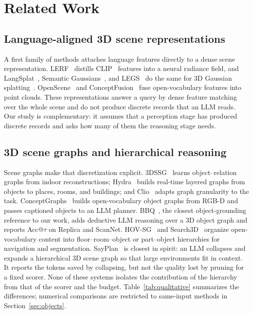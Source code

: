 \documentclass{ieeeaccess}
\begin{document}
\section{Related Work}
\label{sec:related}

\subsection{Language-aligned 3D scene representations}
A first family of methods attaches language features directly to a dense scene
representation. LERF~\cite{kerr2023lerf} distills CLIP~\cite{radford2021clip}
features into a neural radiance field, and LangSplat~\cite{langsplat2024},
Semantic Gaussians~\cite{semanticgaussians2024}, and LEGS~\cite{legs2024} do the
same for 3D Gaussian splatting~\cite{kerbl20233dgs}.
OpenScene~\cite{openscene2023} and ConceptFusion~\cite{conceptfusion2023} fuse
open-vocabulary features into point clouds. These representations answer a query
by dense feature matching over the whole scene and do not produce discrete
records that an LLM reads. Our study is complementary: it assumes that a
perception stage has produced discrete records and asks how many of them the
reasoning stage needs.

\subsection{3D scene graphs and hierarchical reasoning}
Scene graphs make that discretization explicit. 3DSSG~\cite{wald20203dssg}
learns object--relation graphs from indoor reconstructions;
Hydra~\cite{hydra2022} builds real-time layered graphs from objects to places,
rooms, and buildings; and Clio~\cite{maggio2024clio} adapts graph granularity to
the task. ConceptGraphs~\cite{gu2023conceptgraphs} builds open-vocabulary object
graphs from RGB-D and passes captioned objects to an LLM planner.
BBQ~\cite{bbq2024}, the closest object-grounding reference to our work, adds
deductive LLM reasoning over a 3D object graph and reports Acc@$\tau$ on Replica
and ScanNet. HOV-SG~\cite{hovsg2024} and Search3D~\cite{takmaz2025search3d}
organize open-vocabulary content into floor--room--object or part--object
hierarchies for navigation and segmentation. SayPlan~\cite{rana2023sayplan} is
closest in spirit: an LLM collapses and expands a hierarchical 3D scene graph so
that large environments fit in context. It reports the tokens saved by
collapsing, but not the quality lost by pruning for a fixed scorer. None of these
systems isolates the contribution of the hierarchy from that of the scorer and
the budget. Table~\ref{tab:qualitative} summarizes the differences; numerical
comparisons are restricted to same-input methods in Section~\ref{sec:objects}.
\end{document}
